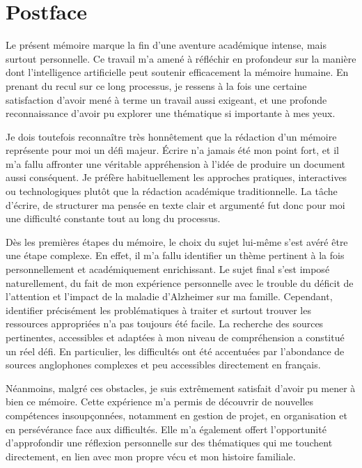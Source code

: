 \documentclass[11pt,a4paper]{report}
\begin{document}
\chapter*{Postface}

Le présent mémoire marque la fin d’une aventure académique intense, mais surtout personnelle. Ce travail m’a amené à réfléchir en profondeur sur la manière dont l’intelligence artificielle peut soutenir efficacement la mémoire humaine. En prenant du recul sur ce long processus, je ressens à la fois une certaine satisfaction d’avoir mené à terme un travail aussi exigeant, et une profonde reconnaissance d’avoir pu explorer une thématique si importante à mes yeux.

Je dois toutefois reconnaître très honnêtement que la rédaction d’un mémoire représente pour moi un défi majeur. Écrire n’a jamais été mon point fort, et il m’a fallu affronter une véritable appréhension à l’idée de produire un document aussi conséquent. Je préfère habituellement les approches pratiques, interactives ou technologiques plutôt que la rédaction académique traditionnelle. La tâche d’écrire, de structurer ma pensée en texte clair et argumenté fut donc pour moi une difficulté constante tout au long du processus.

Dès les premières étapes du mémoire, le choix du sujet lui-même s’est avéré être une étape complexe. En effet, il m’a fallu identifier un thème pertinent à la fois personnellement et académiquement enrichissant. Le sujet final s’est imposé naturellement, du fait de mon expérience personnelle avec le trouble du déficit de l’attention et l’impact de la maladie d’Alzheimer sur ma famille. Cependant, identifier précisément les problématiques à traiter et surtout trouver les ressources appropriées n’a pas toujours été facile. La recherche des sources pertinentes, accessibles et adaptées à mon niveau de compréhension a constitué un réel défi. En particulier, les difficultés ont été accentuées par l’abondance de sources anglophones complexes et peu accessibles directement en français.

Néanmoins, malgré ces obstacles, je suis extrêmement satisfait d’avoir pu mener à bien ce mémoire. Cette expérience m’a permis de découvrir de nouvelles compétences insoupçonnées, notamment en gestion de projet, en organisation et en persévérance face aux difficultés. Elle m’a également offert l’opportunité d’approfondir une réflexion personnelle sur des thématiques qui me touchent directement, en lien avec mon propre vécu et mon histoire familiale.
\end{document}
